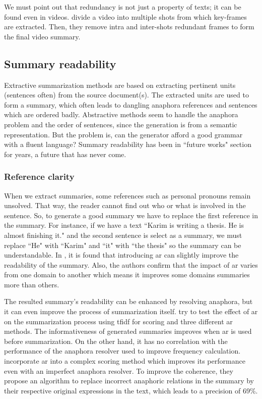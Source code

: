 We must point out that redundancy is not just a property of texts; it can be found even in videos. 
\citet{16-bhaumik-al} divide a video into multiple shots from which key-frames are extracted. 
Then, they remove intra and inter-shots redundant frames to form the final video summary.


\subsection{Summary readability}

Extractive summarization methods are based on extracting pertinent units (sentences often) from the source document(s). 
The extracted units are used to form a summary, which often leads to dangling anaphora references and sentences which are ordered badly.
Abstractive methods seem to handle the anaphora problem and the order of sentences, since the generation is from a semantic representation. 
But the problem is, can the generator afford a good grammar with a fluent language? 
Summary readability has been in ``future works" section for years, a future that has never come. 

\subsubsection{Reference clarity}

When we extract summaries, some references such as personal pronouns remain unsolved. 
That way, the reader cannot find out who or what is involved in the sentence.
So, to generate a good summary we have to replace the first reference in the summary. 
For instance, if we have a text ``Karim is writing a thesis. He is almost finishing it." and the second sentence is select as a summary, we must replace ``He" with ``Karim" and ``it" with ``the thesis" so the summary can be understandable.
In \citep{16-bayomi-al}, it is found that introducing \ac{ar} can slightly improve the readability of the summary. 
Also, the authors confirm that the impact of \ac{ar} varies from one domain to another which means it improves some domains summaries more than others.

The resulted summary's readability can be enhanced by resolving anaphora, but it can even improve the process of summarization itself. 
\citet{07-orasan-stafford} try to test the effect of \ac{ar} on the summarization process using \ac{tfidf} for scoring and three different \ac{ar} methods.
The informativeness of generated summaries improves when \ac{ar} is used before summarization. 
On the other hand, it has no correlation with the performance of the anaphora resolver used to improve frequency calculation. 
\citet{07-steinberger-al} incorporate \ac{ar} into a complex scoring method which improves its performance even with an imperfect anaphora resolver.
To improve the coherence, they propose an algorithm to replace incorrect anaphoric relations in the summary by their respective original expressions in the text, which leads to a precision of 69\%.


